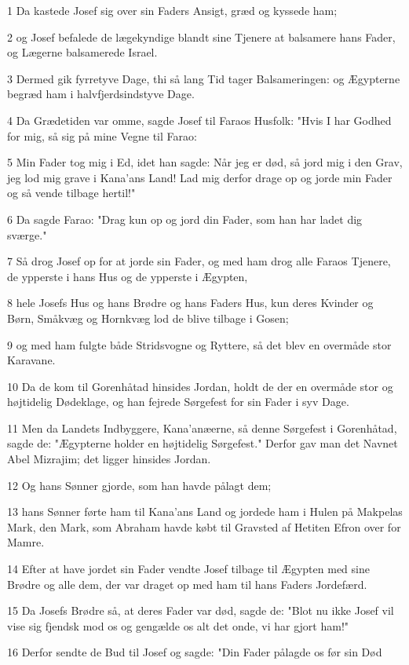 \par 1 Da kastede Josef sig over sin Faders Ansigt, græd og kyssede ham;
\par 2 og Josef befalede de lægekyndige blandt sine Tjenere at balsamere hans Fader, og Lægerne balsamerede Israel.
\par 3 Dermed gik fyrretyve Dage, thi så lang Tid tager Balsameringen: og Ægypterne begræd ham i halvfjerdsindstyve Dage.
\par 4 Da Grædetiden var omme, sagde Josef til Faraos Husfolk: "Hvis I har Godhed for mig, så sig på mine Vegne til Farao:
\par 5 Min Fader tog mig i Ed, idet han sagde: Når jeg er død, så jord mig i den Grav, jeg lod mig grave i Kana'ans Land! Lad mig derfor drage op og jorde min Fader og så vende tilbage hertil!"
\par 6 Da sagde Farao: "Drag kun op og jord din Fader, som han har ladet dig sværge."
\par 7 Så drog Josef op for at jorde sin Fader, og med ham drog alle Faraos Tjenere, de ypperste i hans Hus og de ypperste i Ægypten,
\par 8 hele Josefs Hus og hans Brødre og hans Faders Hus, kun deres Kvinder og Børn, Småkvæg og Hornkvæg lod de blive tilbage i Gosen;
\par 9 og med ham fulgte både Stridsvogne og Ryttere, så det blev en overmåde stor Karavane.
\par 10 Da de kom til Gorenhåtad hinsides Jordan, holdt de der en overmåde stor og højtidelig Dødeklage, og han fejrede Sørgefest for sin Fader i syv Dage.
\par 11 Men da Landets Indbyggere, Kana'anæerne, så denne Sørgefest i Gorenhåtad, sagde de: "Ægypterne holder en højtidelig Sørgefest." Derfor gav man det Navnet Abel Mizrajim; det ligger hinsides Jordan.
\par 12 Og hans Sønner gjorde, som han havde pålagt dem;
\par 13 hans Sønner førte ham til Kana'ans Land og jordede ham i Hulen på Makpelas Mark, den Mark, som Abraham havde købt til Gravsted af Hetiten Efron over for Mamre.
\par 14 Efter at have jordet sin Fader vendte Josef tilbage til Ægypten med sine Brødre og alle dem, der var draget op med ham til hans Faders Jordefærd.
\par 15 Da Josefs Brødre så, at deres Fader var død, sagde de: "Blot nu ikke Josef vil vise sig fjendsk mod os og gengælde os alt det onde, vi har gjort ham!"
\par 16 Derfor sendte de Bud til Josef og sagde: "Din Fader pålagde os før sin Død
